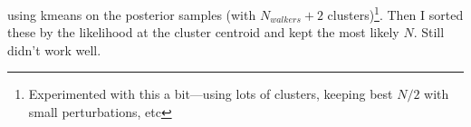 \documentclass{tufte-handout}
\begin{document}
using kmeans on the posterior samples (with $N_{walkers}+2$
clusters)\footnote{Experimented with this a bit---using lots of
  clusters, keeping best $N/2$ with small perturbations, etc}. Then I sorted these by the
likelihood at the cluster centroid and kept the most likely $N$.
Still didn't work well.
\end{document}
